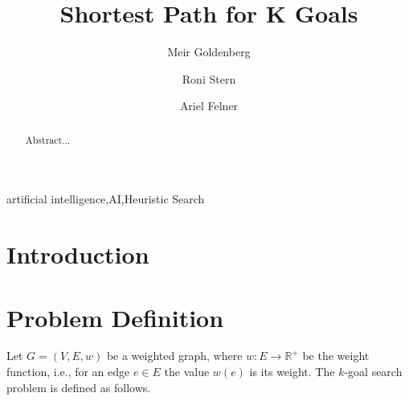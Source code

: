 \documentclass{aicom2e}
\begin{document}
\begin{frontmatter}                           %
%
\title{Shortest Path for K Goals}
\maketitle
%
\author[]{Meir Goldenberg}
\address{Lev Academic Center\\ Jerusalem, Israel\\
	E-mail: mgoldenbe@gmail.com}
\author[]{Roni Stern}
\address{Ben Gurion University of the Negev\\ Be'er Sheva, Israel\\
E-mail: roni.stern@gmail.com}
\author[]{Ariel Felner}
\address{Ben Gurion University of the Negev\\ Be'er Sheva, Israel\\
	E-mail: felner@bgu.ac.il}

\begin{abstract}
Abstract...

\end{abstract}

\begin{keyword}
artificial intelligence\sep AI\sep Heuristic Search
\end{keyword}
%
\end{frontmatter}

\section*{Introduction}


\section{Problem Definition}

Let $G=(V,E,w)$ be a weighted graph, where $w:E\rightarrow \mathbb{R}^+$ be the weight function, i.e., for an edge $e\in E$ the value $w(e)$ is its weight. The $k$-goal search problem is defined as follows. 
\end{document}
